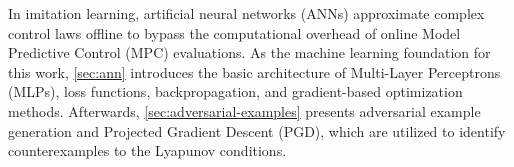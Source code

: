 In imitation learning, artificial neural networks (ANNs) approximate complex control laws offline 
to bypass the computational overhead of online Model Predictive Control (MPC) evaluations. 
As the machine learning foundation for this work, 
\cref{sec:ann} introduces the basic architecture of Multi-Layer Perceptrons (MLPs), 
loss functions, backpropagation, and gradient-based optimization methods. 
Afterwards, \cref{sec:adversarial-examples} presents adversarial example generation and 
Projected Gradient Descent (PGD), which are utilized to identify counterexamples to the Lyapunov conditions.
